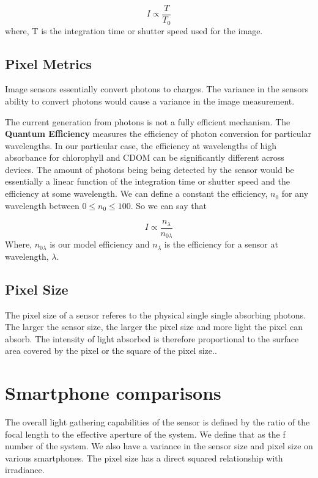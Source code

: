\documentclass{article}
\begin{document}
\begin{equation}
  I \propto \frac{T}{T_0}
\end{equation}
where, T is the integration time or shutter speed used for the image.

\subsection{Pixel Metrics}
Image sensors essentially convert photons to charges. The variance in the
sensors ability to convert photons would cause a variance in the image measurement.

The current generation from photons is not a fully efficient mechanism.
The \textbf{Quantum Efficiency} measures the efficiency of photon conversion
for particular wavelengths. In our particular case, the efficiency at wavelengths
of high absorbance for chlorophyll and CDOM can be significantly different across
devices. The amount of photons being being detected by the sensor would be essentially a
linear function of the integration time or shutter speed and the efficiency at some
wavelength. We can define a constant the efficiency, $ n_0$ for any wavelength between
$ 0 \leq n_0 \leq 100$. So we can say that

\begin{equation}
  I \propto \frac{n_{\lambda}}{n_{0\lambda}}
\end{equation}
Where, $ n_{0\lambda}$ is our model efficiency and $n_{\lambda}$
is the efficiency for a sensor at wavelength, $ \lambda$.



\subsection{Pixel Size}

The pixel size of a sensor referes to the physical single single absorbing photons. The
larger the sensor size, the larger the pixel size and more light the pixel can absorb. The
intensity of light absorbed is therefore proportional to the surface area covered by the pixel
or the square of the pixel size..
\section{Smartphone comparisons}
The overall light gathering capabilities of the sensor is defined by the ratio of the focal length
to the effective aperture of the system. We define that as the f number of the system.
We also have a variance in the sensor size and pixel size on various smartphones. The
pixel size has a direct squared relationship with irradiance.
\end{document}
